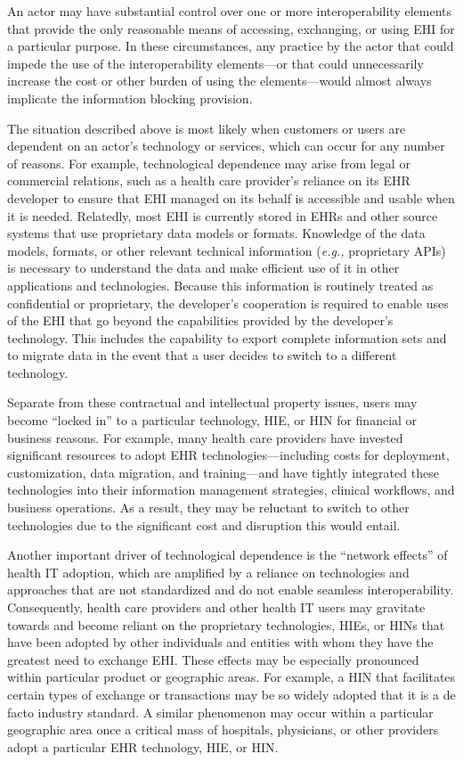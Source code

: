 \documentclass[twoside,11pt]{article}
\begin{document}
          An actor may have substantial control over one or more interoperability elements that provide the only reasonable means of accessing, exchanging, or using EHI for a particular purpose. In these circumstances, any practice by the actor that could impede the use of the interoperability elements—or that could unnecessarily increase the cost or other burden of using the elements—would almost always implicate the information blocking provision.



          The situation described above is most likely when customers or users are dependent on an actor's technology or services, which can occur for any number of reasons. For example, technological dependence may arise from legal or commercial relations, such as a health care provider's reliance on its EHR developer to ensure that EHI managed on its behalf is accessible and usable when it is needed. Relatedly, most EHI is currently stored in EHRs and other source systems that use proprietary data models or formats. Knowledge of the data models, formats, or other relevant technical information (\emph{e.g.,} proprietary APIs) is necessary to understand the data and make efficient use of it in other applications and technologies. Because this information is routinely treated as confidential or proprietary, the developer's cooperation is required to enable uses of the EHI that go beyond the capabilities provided by the developer's technology. This includes the capability to export complete information sets and to migrate data in the event that a user decides to switch to a different technology.


          Separate from these contractual and intellectual property issues, users may become “locked in” to a particular technology, HIE, or HIN for financial or business reasons. For example, many health care providers have invested significant resources to adopt EHR technologies—including costs for deployment, customization, data migration, and training—and have tightly integrated these technologies into their information management strategies, clinical workflows, and business operations. As a result, they may be reluctant to switch to other technologies due to the significant cost and disruption this would entail.


          Another important driver of technological dependence is the “network effects” of health IT adoption, which are amplified by a reliance on technologies and approaches that are not standardized and do not enable seamless interoperability. Consequently, health care providers and other health IT users may gravitate towards and become reliant on the proprietary technologies, HIEs, or HINs that have been adopted by other individuals and entities with whom they have the greatest need to exchange EHI. These effects may be especially pronounced within particular product or geographic areas. For example, a HIN that facilitates certain types of exchange or transactions may be so widely adopted that it is a de facto industry standard. A similar phenomenon may occur within a particular geographic area once a critical mass of hospitals, physicians, or other providers adopt a particular EHR technology, HIE, or HIN.
\end{document}

